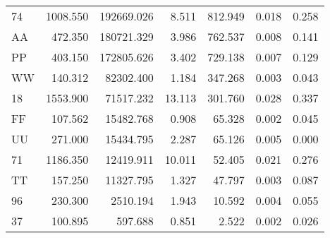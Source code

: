 \begin{tabular}{l|rrrrrr}
          74 &        1008.550 &       192669.026 &       8.511 &              812.949 &        0.018 &                 0.258 \\
          AA &         472.350 &       180721.329 &       3.986 &              762.537 &        0.008 &                 0.141 \\
          PP &         403.150 &       172805.626 &       3.402 &              729.138 &        0.007 &                 0.129 \\
          WW &         140.312 &        82302.400 &       1.184 &              347.268 &        0.003 &                 0.043 \\
          18 &        1553.900 &        71517.232 &      13.113 &              301.760 &        0.028 &                 0.337 \\
          FF &         107.562 &        15482.768 &       0.908 &               65.328 &        0.002 &                 0.045 \\
          UU &         271.000 &        15434.795 &       2.287 &               65.126 &        0.005 &                 0.000 \\
          71 &        1186.350 &        12419.911 &      10.011 &               52.405 &        0.021 &                 0.276 \\
          TT &         157.250 &        11327.795 &       1.327 &               47.797 &        0.003 &                 0.087 \\
          96 &         230.300 &         2510.194 &       1.943 &               10.592 &        0.004 &                 0.055 \\
          37 &         100.895 &          597.688 &       0.851 &                2.522 &        0.002 &                 0.026 \\
\bottomrule
\end{tabular}
